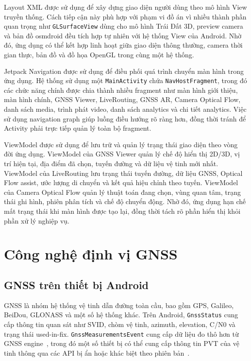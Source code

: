 \documentclass[../DoAn.tex]{subfiles}
\begin{document}
Layout XML được sử dụng để xây dựng giao diện người dùng theo mô hình View truyền thống. Cách tiếp cận này phù hợp với phạm vi đồ án vì nhiều thành phần quan trọng như \texttt{GLSurfaceView} dùng cho mô hình Trái Đất 3D, preview camera và bản đồ osmdroid đều tích hợp tự nhiên với hệ thống View của Android. Nhờ đó, ứng dụng có thể kết hợp linh hoạt giữa giao diện thông thường, camera thời gian thực, bản đồ và đồ họa OpenGL trong cùng một hệ thống.

Jetpack Navigation được sử dụng để điều phối quá trình chuyển màn hình trong ứng dụng. Hệ thống sử dụng một \texttt{MainActivity} chứa \texttt{NavHostFragment}, trong đó các chức năng chính được chia thành nhiều fragment như màn hình giới thiệu, màn hình chính, GNSS Viewer, LiveRouting, GNSS AR, Camera Optical Flow, danh sách media, trình phát video, danh sách analytics và chi tiết analytics. Việc sử dụng navigation graph giúp luồng điều hướng rõ ràng hơn, đồng thời tránh để Activity phải trực tiếp quản lý toàn bộ fragment.

ViewModel được sử dụng để lưu trữ và quản lý trạng thái giao diện theo vòng đời ứng dụng. ViewModel của GNSS Viewer quản lý chế độ hiển thị 2D/3D, vị trí hiện tại, địa điểm đã chọn, tuyến đường và dữ liệu vệ tinh mới nhất. ViewModel của LiveRouting lưu trạng thái tuyến đường, dữ liệu GNSS, Optical Flow assist, ước lượng di chuyển và kết quả hiệu chỉnh theo tuyến. ViewModel của Camera Optical Flow quản lý thuật toán đang chọn, vùng quan tâm, trạng thái ghi hình, phiên phân tích và chế độ chuyển động. Nhờ đó, ứng dụng hạn chế mất trạng thái khi màn hình được tạo lại, đồng thời tách rõ phần hiển thị khỏi phần xử lý nghiệp vụ.

\section{Công nghệ định vị GNSS}
\label{section:3.2}
\subsection{GNSS trên thiết bị Android}
\label{subsection:3.2.1}
GNSS là nhóm hệ thống vệ tinh dẫn đường toàn cầu, bao gồm GPS, Galileo, BeiDou, GLONASS và một số hệ thống khác. Trên Android, \texttt{GnssStatus} cung cấp thông tin quan sát như SVID, chòm vệ tinh, azimuth, elevation, C/N0 và trạng thái used-in-fix. \texttt{GnssMeasurementsEvent} cung cấp dữ liệu đo thô hơn từ GNSS engine~\cite{android-gnss-event}, trong đó một số thiết bị có thể cung cấp thông tin PVT của vệ tinh thông qua các API bị ẩn hoặc khác biệt theo phiên bản~\cite{android-gnss-measurement}.
\end{document}
